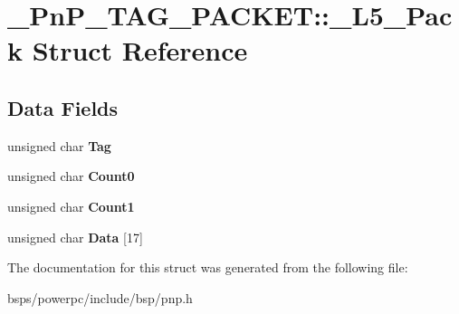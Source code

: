 \hypertarget{struct__PnP__TAG__PACKET_1_1__L5__Pack}{}\section{\+\_\+\+Pn\+P\+\_\+\+T\+A\+G\+\_\+\+P\+A\+C\+K\+ET\+::\+\_\+\+L5\+\_\+\+Pack Struct Reference}
\label{struct__PnP__TAG__PACKET_1_1__L5__Pack}
\subsection*{Data Fields}
\begin{DoxyCompactItemize}
\item 
\mbox{\label{struct__PnP__TAG__PACKET_1_1__L5__Pack_a729cf0449050e232366dd0ca2703a125}} 
unsigned char {\bfseries Tag}
\item 
\mbox{\label{struct__PnP__TAG__PACKET_1_1__L5__Pack_abffc7786f23ba260e677d1880ed402a1}} 
unsigned char {\bfseries Count0}
\item 
\mbox{\label{struct__PnP__TAG__PACKET_1_1__L5__Pack_ab0447ab46e42895ccf95a306c6da0abe}} 
unsigned char {\bfseries Count1}
\item 
\mbox{\label{struct__PnP__TAG__PACKET_1_1__L5__Pack_a9b446b92fbba47a41519ecfb336c9c4a}} 
unsigned char {\bfseries Data} \mbox{[}17\mbox{]}
\end{DoxyCompactItemize}


The documentation for this struct was generated from the following file\+:\begin{DoxyCompactItemize}
\item 
bsps/powerpc/include/bsp/pnp.\+h\end{DoxyCompactItemize}
